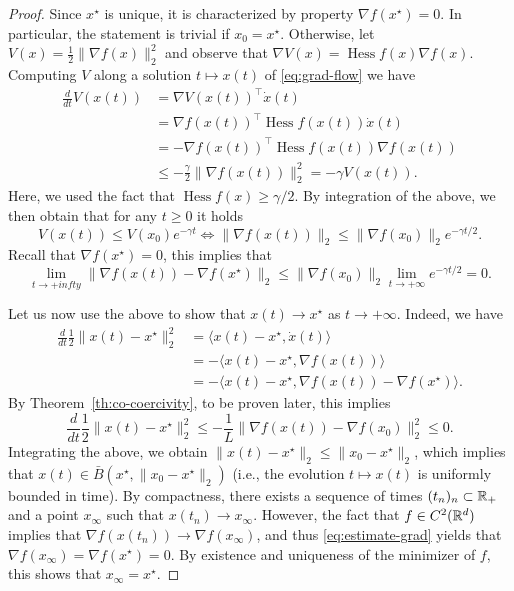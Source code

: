 \documentclass{report}
\begin{document}
\begin{proof}
	Since $x^\star$ is unique, it is characterized by property $\nabla f(x^\star)=0$. In particular, the statement is trivial if $x_0=x^\star$.
	Otherwise, let $V(x) = \frac12\|\nabla f(x)\|_2^2$ and observe that $\nabla V(x) = \operatorname{Hess}f(x) \nabla f(x)$. Computing $V$ along a solution $t\mapsto x(t)$ of \eqref{eq:grad-flow} we have
	\begin{equation}
		\begin{split}
			\frac{d}{dt}V(x(t)) 
			&= \nabla V(x(t))^\top \dot x(t) \\
			&= \nabla f(x(t))^\top \operatorname{Hess}f(x(t)) \dot x(t) \\
			&= -\nabla f(x(t))^\top \operatorname{Hess}f(x(t)) \nabla f(x(t))\\
			&\le -\frac{\gamma}2 \|\nabla f(x(t))\|_2^2 = -\gamma V(x(t)).
		\end{split}
	\end{equation}
	Here, we used the fact that $\operatorname{Hess}f(x)\ge \gamma/2$.
	By integration of the above, we then obtain that for any $t\ge 0$ it holds
	\begin{equation}
		V(x(t)) \le V(x_0)e^{-\gamma t} 
		\iff
		\|\nabla f(x(t))\|_2\le \|\nabla f(x_0)\|_2 e^{-\gamma t/2}.
	\end{equation}
	Recall that $\nabla f(x^\star)=0$, this implies that 
	\begin{equation}
		\label{eq:estimate-grad}
		\lim_{t\to +infty} \|\nabla f(x(t)) - \nabla f(x^\star)\|_2 \le \|\nabla f(x_0)\|_2 \lim_{t\to +\infty} e^{-\gamma t/2} = 0.
	\end{equation}

	Let us now use the above to show that $x(t)\rightarrow x^\star$ as $t\to +\infty$.
	Indeed, we have 
	\begin{equation}
		\begin{split}
			\frac{d}{dt}\frac12\|x(t)-x^\star\|_2^2
			&= \langle x(t)-x^\star, \dot x(t) \rangle\\
			&= -\langle x(t)-x^\star, \nabla f( x(t)) \rangle\\ 
			&= -\langle x(t)-x^\star, \nabla f( x(t)) - \nabla f(x^\star) \rangle.
		\end{split}
	\end{equation}
	By Theorem~\ref{th:co-coercivity}, to be proven later, this implies
	\begin{equation}
		\frac{d}{dt}\frac12\|x(t)-x^\star\|_2^2	
		\le -\frac{1}{L} \|\nabla f(x(t))-\nabla f(x_0)\|_2^2
		\le 0.
	\end{equation}
	Integrating the above, we obtain $\|x(t)-x^\star\|_2 \le \|x_0-x^\star\|_2$, which implies that $x(t)\in \bar B(x^\star, \|x_0-x^\star\|_2)$ (i.e., the evolution $t\mapsto x(t)$ is uniformly bounded in time). 
	By compactness, there exists a sequence of times $(t_n)_n\subset \mathbb{R}_+$ and a point $x_\infty$ such that $x(t_n)\rightarrow x_\infty$. 
	However, the fact that $f\in C^2(\mathbb{R}^d)$ implies that $\nabla f(x(t_n))\rightarrow \nabla f(x_\infty)$, and thus  \eqref{eq:estimate-grad} yields that $\nabla f(x_\infty) = \nabla f(x^\star)=0$.
	By existence and uniqueness of the minimizer of $f$, this shows that $x_\infty=x^\star$.
\end{proof}
\end{document}
